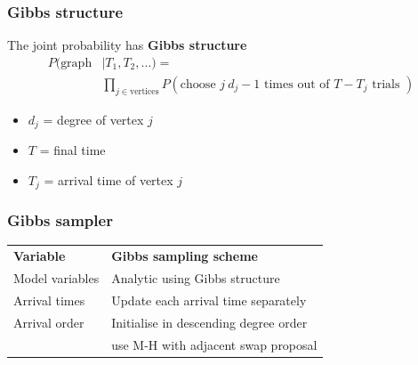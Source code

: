 \documentclass[final,hyperref={pdfpagelabels=false},noamsthm]{beamer}
\begin{document}
\begin{frame}
	\frametitle{Gibbs structure}
	The joint probability has \textbf{Gibbs structure}
	\begin{align*}
	P(\text{graph}&|T_1, T_2, ...) = \\
	& \prod_{j \in \text{vertices}} P(\text{choose }j\ d_j-1\text{ times out of } T - T_j \text{ trials })
	\end{align*}
	\begin{itemize}
		\item $d_j$ = degree of vertex $j$
		\item $T$ = final time
		\item $T_j$ = arrival time of vertex $j$
	\end{itemize}
\end{frame}

\begin{frame}
	\frametitle{Gibbs sampler}
	\begin{center}
		\begin{tabular}{l|l}
			\textbf{Variable} & \textbf{Gibbs sampling scheme} \\
			\Xhline{4\arrayrulewidth}
			\rule{0pt}{3ex}
			Model variables & Analytic using Gibbs structure \\
			\hline
			\rule{0pt}{3ex}
			Arrival times & Update each arrival time separately \\
			\hline
			\rule{0pt}{3ex}
			Arrival order & Initialise in descending degree order \\
			& \quad use M-H with adjacent swap proposal 
		\end{tabular}
	\end{center}
\end{frame}
\end{document}

